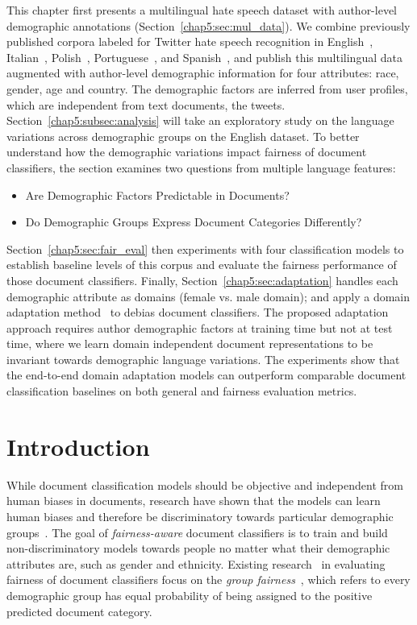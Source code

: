 This chapter first presents a multilingual hate speech dataset with author-level demographic annotations (Section~\ref{chap5:sec:mul_data}). 
We combine previously published corpora labeled for Twitter hate speech recognition in English~\cite{waseem2016hateful,waseem2016you,founta2018large}, Italian~\cite{sanguinetti2018italian}, Polish~\cite{ptaszynski2017learning}, Portuguese~\cite{fortuna2019hierarchically}, and Spanish~\cite{basile2019semeval}, and publish this multilingual data augmented with author-level demographic information for four attributes: race, gender, age and country.
The demographic factors are inferred from user profiles, which are independent from text documents, the tweets.
Section~\ref{chap5:subsec:analysis} will take an exploratory study on the language variations across demographic groups on the English dataset.
To better understand how the demographic variations impact fairness of document classifiers, the section examines two questions from multiple language features:
\begin{itemize}
    \item Are Demographic Factors Predictable in Documents?
    \item Do Demographic Groups Express Document Categories Differently?
\end{itemize}
Section~\ref{chap5:sec:fair_eval} then experiments with four classification models to establish baseline levels of this corpus and evaluate the fairness performance of those document classifiers.
Finally, Section~\ref{chap5:sec:adaptation} handles each demographic attribute as domains (female vs. male domain); and apply a domain adaptation method~\cite{daume2007frustratingly} to debias document classifiers.
The proposed adaptation approach requires author demographic factors at training time but not at test time, where we learn domain independent document representations to be invariant towards demographic language variations.
The experiments show that the end-to-end domain adaptation models can outperform comparable document classification baselines on both general and fairness evaluation metrics.

\section{Introduction}


While document classification models should be objective and independent from human biases in documents, research have shown that the models can learn human biases and therefore be discriminatory towards particular demographic groups~\cite{dixon2018measuring,borkan2019nuanced,sun2019mitigating}.
The goal of \textit{fairness-aware} document classifiers is to train and build non-discriminatory models towards people no matter what their demographic attributes are, such as gender and ethnicity.
Existing research~\cite{dixon2018measuring,kiritchenko2018examining,park2018reducing,garg2019counterfactual,borkan2019nuanced} in evaluating fairness of document classifiers focus on the \textit{group fairness}~\cite{chouldechova2018frontiers}, which refers to every demographic group has equal probability of being assigned to the positive predicted document category.


